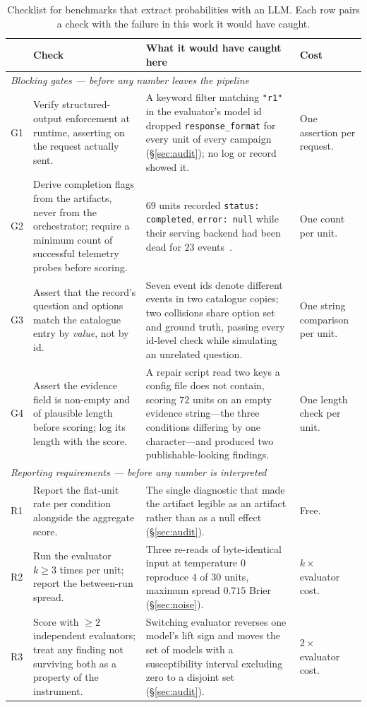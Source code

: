 \documentclass[10pt,conference]{IEEEtran}
\begin{document}
\begin{table}[!t]
\centering
\caption{Checklist for benchmarks that extract probabilities with an LLM. Each row pairs a check with the failure in this work it would have caught.}
\label{tab:checklist}
\footnotesize
\begin{tabular}{p{}p{}p{}p{}}
\toprule
& \textbf{Check} & \textbf{What it would have caught here} & \textbf{Cost} \\
\midrule
\multicolumn{4}{l}{\emph{Blocking gates --- before any number leaves the pipeline}} \\
\midrule
G1 & Verify structured-output enforcement at runtime, asserting on the request actually sent. & A keyword filter matching \texttt{"r1"} in the evaluator's model id dropped \texttt{response\_format} for every unit of every campaign (\S\ref{sec:audit}); no log or record showed it. & One assertion per request. \\
G2 & Derive completion flags from the artifacts, never from the orchestrator; require a minimum count of successful telemetry probes before scoring. & $69$ units recorded \texttt{status: completed}, \texttt{error: null} while their serving backend had been dead for $23$ events~\cite{techreport}. & One count per unit. \\
G3 & Assert that the record's question and options match the catalogue entry by \emph{value}, not by id. & Seven event ids denote different events in two catalogue copies; two collisions share option set and ground truth, passing every id-level check while simulating an unrelated question. & One string comparison per unit. \\
G4 & Assert the evidence field is non-empty and of plausible length before scoring; log its length with the score. & A repair script read two keys a config file does not contain, scoring $72$ units on an empty evidence string---the three conditions differing by one character---and produced two publishable-looking findings. & One length check per unit. \\
\midrule
\multicolumn{4}{l}{\emph{Reporting requirements --- before any number is interpreted}} \\
\midrule
R1 & Report the flat-unit rate per condition alongside the aggregate score. & The single diagnostic that made the artifact legible as an artifact rather than as a null effect (\S\ref{sec:audit}). & Free. \\
R2 & Run the evaluator $k \geq 3$ times per unit; report the between-run spread. & Three re-reads of byte-identical input at temperature $0$ reproduce $4$ of $30$ units, maximum spread $0.715$ Brier (\S\ref{sec:noise}). & $k\times$ evaluator cost. \\
R3 & Score with $\geq 2$ independent evaluators; treat any finding not surviving both as a property of the instrument. & Switching evaluator reverses one model's lift sign and moves the set of models with a susceptibility interval excluding zero to a disjoint set (\S\ref{sec:audit}). & $2\times$ evaluator cost. \\
\bottomrule
\end{tabular}
\end{table}
\end{document}
